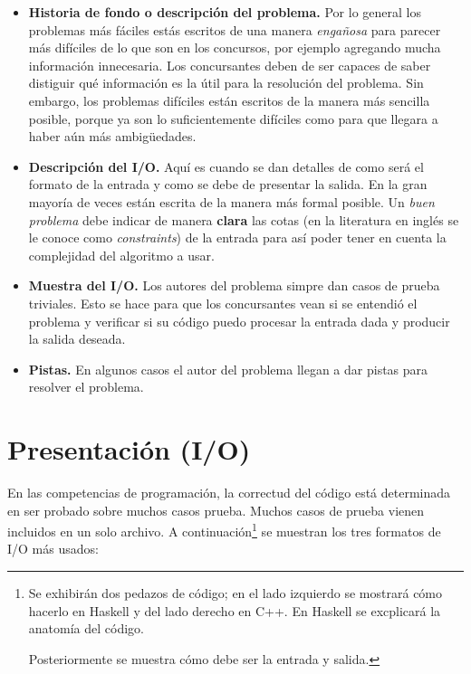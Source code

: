 \begin{itemize}
\item \textbf{Historia de fondo o descripción del problema.} Por lo general los problemas más
fáciles estás escritos de una manera \emph{engañosa} para parecer más difíciles de lo que son en
los concursos, por ejemplo agregando mucha información innecesaria. Los concursantes deben de
ser capaces de saber distiguir qué información es la útil para la resolución del problema. Sin
embargo, los problemas difíciles están escritos de la manera más sencilla posible, porque ya
son lo suficientemente difíciles como para que llegara a haber aún más ambigüedades.

\item \textbf{Descripción del I/O.} Aquí es cuando se dan detalles de como será el formato de la
entrada y como se debe de presentar la salida. En la gran mayoría de veces están escrita de la
manera más formal posible. Un \emph{buen problema} debe indicar de manera \textbf{clara} las cotas 
(en la literatura en inglés se le conoce como \emph{constraints}) de la entrada para así poder
tener en cuenta la complejidad del algoritmo a usar.

\item \textbf{Muestra del I/O.} Los autores del problema simpre dan casos de prueba triviales. Esto
se hace para que los concursantes vean si se entendió el problema y verificar si su código puedo
procesar la entrada dada y producir la salida deseada.

\item \textbf{Pistas.} En algunos casos el autor del problema llegan a dar pistas para resolver
el problema.

\end{itemize}

\section{Presentación (I/O)}

En las competencias de programación, la correctud del código está determinada en ser probado
sobre muchos casos prueba. Muchos casos de prueba vienen incluidos en un solo archivo. A
continuación\footnote{
    Se exhibirán dos pedazos de código; en el lado izquierdo se mostrará cómo hacerlo en Haskell
    y del lado derecho en C++. 
    En Haskell se excplicará la anatomía del código.

    Posteriormente se muestra cómo debe ser la entrada y salida.
} se muestran los tres formatos de I/O más usados:

